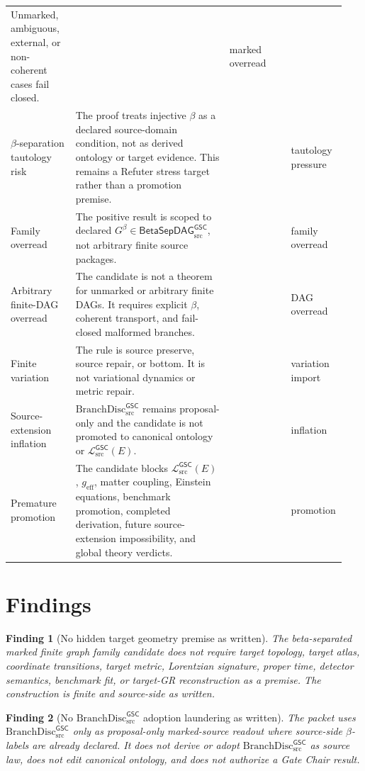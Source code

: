 \documentclass[11pt]{article}
\newcommand{\MetricData}{\mathcal{L}_{\mathrm{src}}^{\mathsf{GSC}}}
\newcommand{\geff}{g_{\mathrm{eff}}}
\newcommand{\BranchDisc}{\mathrm{BranchDisc}_{\mathrm{src}}^{\mathsf{GSC}}}
\newcommand{\BetaGraph}{\mathsf{BetaSepDAG}_{\mathrm{src}}^{\mathsf{GSC}}}
\newcommand{\Pass}{\mathrm{pass\_no\_smuggling\_detected}}
\newtheorem{finding}{Finding}
\begin{document}
\begin{longtable}{p{0.19\linewidth}p{0.45\linewidth}p{0.18\linewidth}p{0.12\linewidth}}
Unmarked, ambiguous, external, or non-coherent cases fail closed. &
\Pass & marked overread \\
\(\beta\)-separation tautology risk &
The proof treats injective \(\beta\) as a declared source-domain condition,
not as derived ontology or target evidence. This remains a Refuter stress
target rather than a promotion premise. &
\Pass & tautology pressure \\
Family overread &
The positive result is scoped to declared \(G^\beta\in\BetaGraph\), not
arbitrary finite source packages. &
\Pass & family overread \\
Arbitrary finite-DAG overread &
The candidate is not a theorem for unmarked or arbitrary finite DAGs. It
requires explicit \(\beta\), coherent transport, and fail-closed malformed
branches. &
\Pass & DAG overread \\
Finite variation &
The rule is source preserve, source repair, or bottom. It is not variational
dynamics or metric repair. &
\Pass & variation import \\
Source-extension inflation &
\(\BranchDisc\) remains proposal-only and the candidate is not promoted to
canonical ontology or \(\MetricData(E)\). &
\Pass & inflation \\
Premature promotion &
The candidate blocks \(\MetricData(E)\), \(\geff\), matter coupling, Einstein
equations, benchmark promotion, completed derivation, future source-extension
impossibility, and global theory verdicts. &
\Pass & promotion \\
\bottomrule
\end{longtable}

\section{Findings}

\begin{finding}[No hidden target geometry premise as written]
The beta-separated marked finite graph family candidate does not require target
topology, target atlas, coordinate transitions, target metric, Lorentzian
signature, proper time, detector semantics, benchmark fit, or target-GR
reconstruction as a premise. The construction is finite and source-side as
written.
\end{finding}

\begin{finding}[No \(\BranchDisc\) adoption laundering as written]
The packet uses \(\BranchDisc\) only as proposal-only marked-source readout
where source-side \(\beta\)-labels are already declared. It does not derive or
adopt \(\BranchDisc\) as source law, does not edit canonical ontology, and
does not authorize a Gate Chair result.
\end{finding}
\end{document}
